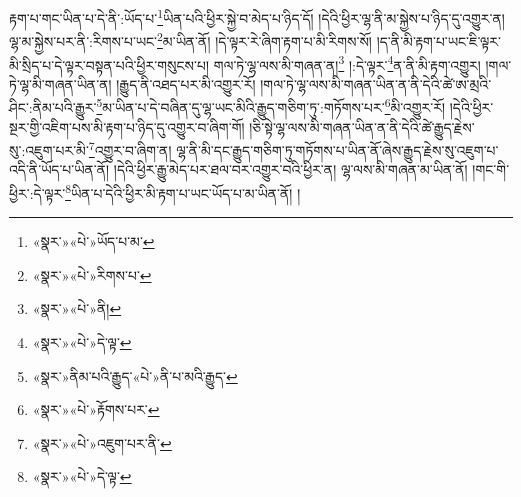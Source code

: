 རྟག་པ་གང་ཡིན་པ་དེ་ནི་:ཡོད་པ་\footnote{«སྣར་»«པེ་»ཡོད་པ་མ་}ཡིན་པའི་ཕྱིར་སྐྱེ་བ་མེད་པ་ཉིད་དོ། །དེའི་ཕྱིར་ལྷ་ནི་མ་སྐྱེས་པ་ཉིད་དུ་འགྱུར་ན། ལྷ་མ་སྐྱེས་པར་ནི་:རིགས་པ་ཡང་\footnote{«སྣར་»«པེ་»རིགས་པ་}མ་ཡིན་ནོ། །དེ་ལྟར་རེ་ཞིག་རྟག་པ་མི་རིགས་སོ། །ད་ནི་མི་རྟག་པ་ཡང་ཇི་ལྟར་མི་སྲིད་པ་དེ་ལྟར་བསྟན་པའི་ཕྱིར་གསུངས་པ། གལ་ཏེ་ལྷ་ལས་མི་གཞན་ན།\footnote{«སྣར་»«པེ་»ནི།} །:དེ་ལྟར་\footnote{«སྣར་»«པེ་»དེ་ལྟ་}ན་ནི་མི་རྟག་འགྱུར། །གལ་ཏེ་ལྷ་མི་གཞན་ཡིན་ན། །རྒྱུད་ནི་འཐད་པར་མི་འགྱུར་རོ། །གལ་ཏེ་ལྷ་ལས་མི་གཞན་ཡིན་ན་ནི་དེའི་ཚེ་ཨ་མྲའི་ཤིང་:ནིམ་པའི་རྒྱུར་\footnote{«སྣར་»ནིམ་པའི་རྒྱུད་«པེ་»ནི་པ་མའི་རྒྱུད་}མ་ཡིན་པ་དེ་བཞིན་དུ་ལྷ་ཡང་མིའི་རྒྱུད་གཅིག་ཏུ་:གཏོགས་པར་\footnote{«སྣར་»«པེ་»རྟོགས་པར་}མི་འགྱུར་རོ། །དེའི་ཕྱིར་སྔར་གྱི་འཇིག་པས་མི་རྟག་པ་ཉིད་དུ་འགྱུར་བ་ཞིག་གོ། །ཅི་སྟེ་ལྷ་ལས་མི་གཞན་ཡིན་ན་ནི་དེའི་ཚེ་རྒྱུད་རྗེས་སུ་:འཇུག་པར་མི་\footnote{«སྣར་»«པེ་»འཇུག་པར་ནི་}འགྱུར་བ་ཞིག་ན། ལྷ་ནི་མི་དང་རྒྱུད་གཅིག་ཏུ་གཏོགས་པ་ཡིན་ནོ་ཞེས་རྒྱུད་རྗེས་སུ་འཇུག་པ་འདི་ནི་ཡོད་པ་ཡིན་ནོ། །དེའི་ཕྱིར་རྒྱུ་མེད་པར་ཐལ་བར་འགྱུར་བའི་ཕྱིར་ན། ལྷ་ལས་མི་གཞན་མ་ཡིན་ནོ། །གང་གི་ཕྱིར་:དེ་ལྟར་\footnote{«སྣར་»«པེ་»དེ་ལྟ་}ཡིན་པ་དེའི་ཕྱིར་མི་རྟག་པ་ཡང་ཡོད་པ་མ་ཡིན་ནོ། །
